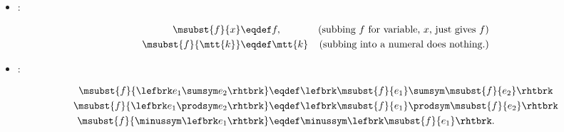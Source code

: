 \begin{definition}
\begin{definition}
\begin{itemize}
\item {}:

\begin{align}
\msubst{f}{x} & \eqdef f, \label{subst-var} 
    & \text{(subbing $f$ for variable, $x$, just gives $f$)}\\
\msubst{f}{\mtt{k}} & \eqdef \mtt{k}
    & \text{(subbing into a numeral does nothing.)}\label{subst-const}
\end{align}


\item {}:


\begin{align}
\msubst{f}{\lefbrk e_1 \sumsym e_2\rhtbrk} & \eqdef  \lefbrk \msubst{f}{e_1} \sumsym
\msubst{f}{e_2}\rhtbrk\label{subst-sum}\\
\msubst{f}{\lefbrk e_1 \prodsym e_2\rhtbrk} & \eqdef  \lefbrk \msubst{f}{e_1} \prodsym
\msubst{f}{e_2}\rhtbrk\label{subst-prod} \\
\msubst{f}{\minussym\lefbrk e_1\rhtbrk} & \eqdef \minussym \lefbrk
       \msubst{f}{e_1}\rhtbrk.\label{subst-minus} 
\end{align}
\end{itemize}
\end{definition}


\end{definition}
